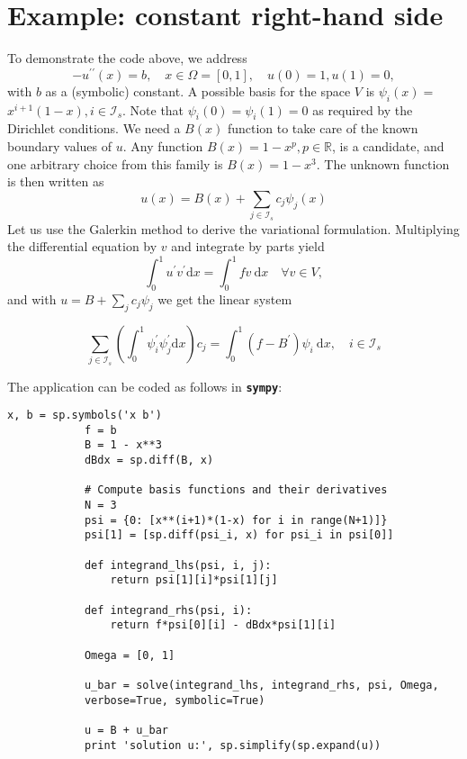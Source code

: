 \documentclass[../main.tex]{subfiles}
\begin{document}
	\section[Example: constant right-hand side]{Example: constant right-hand side}
		\label{sec:sec_16_2}
		\noindent To demonstrate the code above, we address
		$$
		-u^{\prime \prime}(x)=b, \quad x \in \Omega=[0,1], \quad u(0)=1, u(1)=0,
		$$
		with $b$ as a (symbolic) constant. A possible basis for the space $V$ is $\psi_{i}(x)=$ $x^{i+1}(1-x), i \in \mathcal{I}_{s}$. Note that $\psi_{i}(0)=\psi_{i}(1)=0$ as required by the Dirichlet conditions. We need a $B(x)$ function to take care of the known boundary values of $u$. Any function $B(x)=1-x^{p}, p \in \mathbb{R}$, is a candidate, and one arbitrary choice from this family is $B(x)=1-x^{3}$. The unknown function is then written as
		$$
		u(x)=B(x)+\sum_{j \in \mathcal{I}_{s}} c_{j} \psi_{j}(x)
		$$\smallbreak
		Let us use the Galerkin method to derive the variational formulation. Multiplying the differential equation by $v$ and integrate by parts yield
		$$
		\int_{0}^{1} u^{\prime} v^{\prime} \mathrm{d} x=\int_{0}^{1} f v \mathrm{~d} x \quad \forall v \in V,
		$$
		and with $u=B+\sum_{j} c_{j} \psi_{j}$ we get the linear system
		
		\begin{equation}
			\label{eqa196}
			\sum_{j \in \mathcal{I}_{s}}\left(\int_{0}^{1} \psi_{i}^{\prime} \psi_{j}^{\prime} \mathrm{d} x\right) c_{j}=\int_{0}^{1}\left(f-B^{\prime}\right) \psi_{i} \mathrm{~d} x, \quad i \in \mathcal{I}_{s}
		\end{equation}
		
		The application can be coded as follows in \textbf{\texttt{sympy}}:
		
		\begin{lstlisting}[numbers=none]
			x, b = sp.symbols('x b')
			f = b
			B = 1 - x**3
			dBdx = sp.diff(B, x)
			
			# Compute basis functions and their derivatives
			N = 3
			psi = {0: [x**(i+1)*(1-x) for i in range(N+1)]}
			psi[1] = [sp.diff(psi_i, x) for psi_i in psi[0]]
			
			def integrand_lhs(psi, i, j):
				return psi[1][i]*psi[1][j]
				
			def integrand_rhs(psi, i):
				return f*psi[0][i] - dBdx*psi[1][i]
				
			Omega = [0, 1]
			
			u_bar = solve(integrand_lhs, integrand_rhs, psi, Omega,
			verbose=True, symbolic=True)
			
			u = B + u_bar
			print 'solution u:', sp.simplify(sp.expand(u))
		\end{lstlisting}
	
\end{document}

